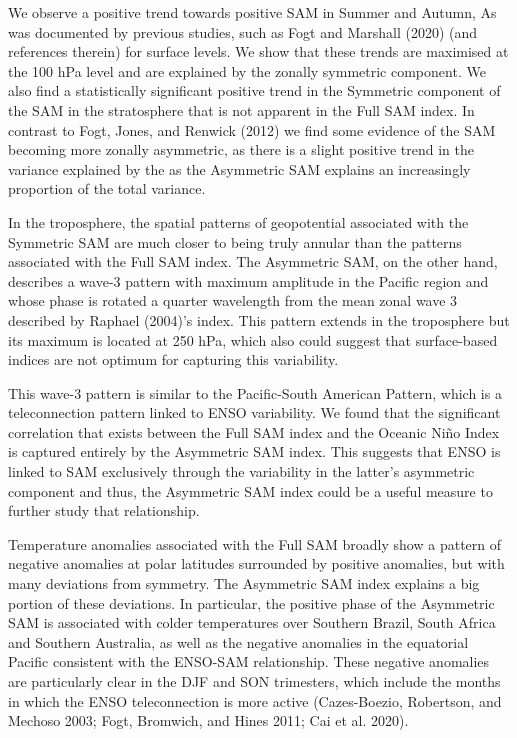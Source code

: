 \documentclass[smallextended]{svjour3}       %
\begin{document}
We observe a positive trend towards positive SAM in Summer and Autumn, As was documented by previous studies, such as Fogt and Marshall (2020) (and references therein) for surface levels. We show that these trends are maximised at the 100 hPa level and are explained by the zonally symmetric component. We also find a statistically significant positive trend in the Symmetric component of the SAM in the stratosphere that is not apparent in the Full SAM index. In contrast to Fogt, Jones, and Renwick (2012) we find some evidence of the SAM becoming more zonally asymmetric, as there is a slight positive trend in the variance explained by the as the Asymmetric SAM explains an increasingly proportion of the total variance.

In the troposphere, the spatial patterns of geopotential associated with the Symmetric SAM are much closer to being truly annular than the patterns associated with the Full SAM index. The Asymmetric SAM, on the other hand, describes a wave-3 pattern with maximum amplitude in the Pacific region and whose phase is rotated a quarter wavelength from the mean zonal wave 3 described by Raphael (2004)'s index. This pattern extends in the troposphere but its maximum is located at 250 hPa, which also could suggest that surface-based indices are not optimum for capturing this variability.

This wave-3 pattern is similar to the Pacific-South American Pattern, which is a teleconnection pattern linked to ENSO variability. We found that the significant correlation that exists between the Full SAM index and the Oceanic Niño Index is captured entirely by the Asymmetric SAM index. This suggests that ENSO is linked to SAM exclusively through the variability in the latter's asymmetric component and thus, the Asymmetric SAM index could be a useful measure to further study that relationship.

Temperature anomalies associated with the Full SAM broadly show a pattern of negative anomalies at polar latitudes surrounded by positive anomalies, but with many deviations from symmetry. The Asymmetric SAM index explains a big portion of these deviations. In particular, the positive phase of the Asymmetric SAM is associated with colder temperatures over Southern Brazil, South Africa and Southern Australia, as well as the negative anomalies in the equatorial Pacific consistent with the ENSO-SAM relationship. These negative anomalies are particularly clear in the DJF and SON trimesters, which include the months in which the ENSO teleconnection is more active (Cazes-Boezio, Robertson, and Mechoso 2003; Fogt, Bromwich, and Hines 2011; Cai et al. 2020).
\end{document}
